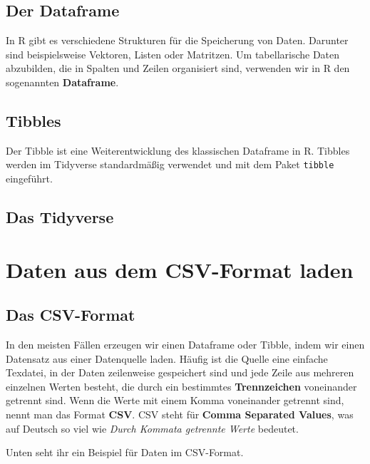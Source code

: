 \documentclass[
]{book}
\begin{document}
\hypertarget{der-dataframe}{%
\section{Der Dataframe}\label{der-dataframe}}

In R gibt es verschiedene Strukturen für die Speicherung von Daten. Darunter sind beispielsweise Vektoren, Listen oder Matritzen. Um tabellarische Daten abzubilden, die in Spalten und Zeilen organisiert sind, verwenden wir in R den sogenannten \textbf{Dataframe}.

\hypertarget{tibbles}{%
\section{Tibbles}\label{tibbles}}

Der Tibble ist eine Weiterentwicklung des klassischen Dataframe in R. Tibbles werden im Tidyverse standardmäßig verwendet und mit dem Paket \texttt{tibble} eingeführt.

\hypertarget{das-tidyverse}{%
\section{Das Tidyverse}\label{das-tidyverse}}

\hypertarget{daten-aus-dem-csv-format-laden}{%
\chapter{Daten aus dem CSV-Format laden}\label{daten-aus-dem-csv-format-laden}}

\hypertarget{das-csv-format}{%
\section{Das CSV-Format}\label{das-csv-format}}

In den meisten Fällen erzeugen wir einen Dataframe oder Tibble, indem wir einen Datensatz aus einer Datenquelle laden. Häufig ist die Quelle eine einfache Texdatei, in der Daten zeilenweise gespeichert sind und jede Zeile aus mehreren einzelnen Werten besteht, die durch ein bestimmtes \textbf{Trennzeichen} voneinander getrennt sind. Wenn die Werte mit einem Komma voneinander getrennt sind, nennt man das Format \textbf{CSV}. CSV steht für \textbf{Comma Separated Values}, was auf Deutsch so viel wie \emph{Durch Kommata getrennte Werte} bedeutet.

Unten seht ihr ein Beispiel für Daten im CSV-Format.
\end{document}

